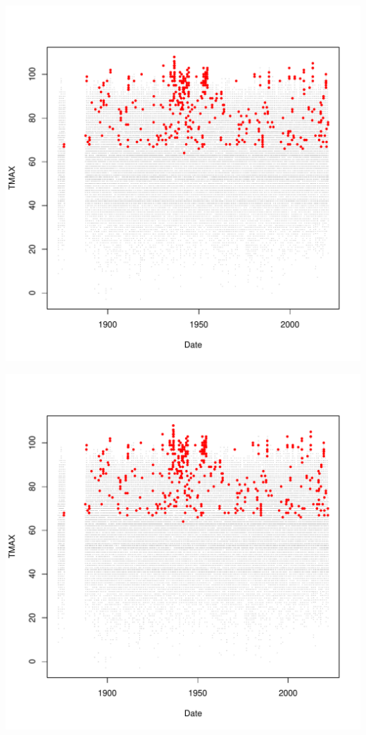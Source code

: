 \documentclass{article}\usepackage[]{graphicx}\usepackage[]{color}
\makeatletter
\def\maxwidth{ %
  \ifdim\Gin@nat@width>\linewidth
    \linewidth
  \else
    \Gin@nat@width
  \fi
}
\newenvironment{knitrout}{}{} %
\makeatother
\begin{document}
\begin{knitrout}
\includegraphics[width=\maxwidth]{figure/unnamed-chunk-4-70} 

\includegraphics[width=\maxwidth]{figure/unnamed-chunk-4-71} 
\end{knitrout}
\end{document}
